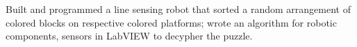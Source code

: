 \documentclass[letterpaper]{deedy-resume-openfont} %
\begin{document}
\begin{minipage}[t]{0.66\textwidth}
\sectionsep %

\begin{tightemize}
\item Built and programmed a line sensing robot that sorted a random arrangement of colored blocks  on respective colored platforms; wrote an algorithm for robotic components, sensors in LabVIEW to decypher the puzzle.
\end{tightemize}
\sectionsep %


\end{minipage} %








\end{document}
